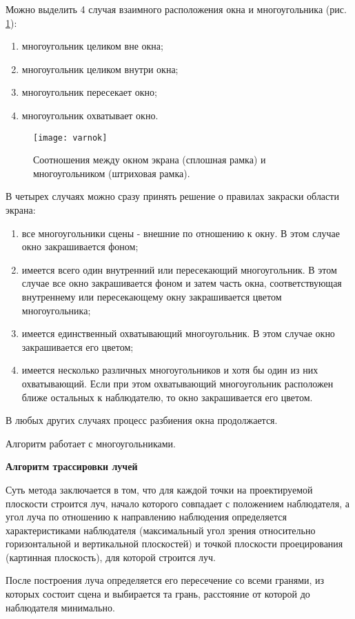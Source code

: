 Можно выделить 4 случая взаимного расположения окна и многоугольника (рис. \ref{img:varnok}):
\begin{enumerate}
	\item многоугольник целиком вне окна;
	\item многоугольник целиком внутри окна;
	\item многоугольник пересекает окно;
	\item многоугольник охватывает окно.
\end{enumerate}

\begin{figure}[H]
	\centering
	\texttt{[image: varnok]}
	\caption{Соотношения между окном экрана (сплошная рамка) и многоугольником (штриховая рамка). }
	\label{img:varnok}
\end{figure}

В четырех случаях можно сразу принять решение о правилах закраски области экрана:
\begin{enumerate}
	\item все многоугольники сцены - внешние по отношению к окну. В этом случае окно закрашивается фоном;
	\item имеется всего один внутренний или пересекающий многоугольник. В этом случае все окно закрашивается фоном и затем часть окна, соответствующая внутреннему или пересекающему окну закрашивается цветом многоугольника;
	\item имеется единственный охватывающий многоугольник. В этом случае окно закрашивается его цветом;
	\item имеется несколько различных многоугольников и хотя бы один из них охватывающий. Если при этом охватывающий многоугольник расположен ближе остальных к наблюдателю, то окно закрашивается его цветом.
\end{enumerate}
В любых других случаях процесс разбиения окна продолжается.

Алгоритм работает с многоугольниками. 

\textbf{Алгоритм трассировки лучей }

Суть метода заключается в том, что для каждой точки на проектируемой плоскости строится луч, начало которого совпадает с положением наблюдателя, а угол луча по отношению к направлению наблюдения определяется характеристиками наблюдателя (максимальный угол зрения относительно горизонтальной и вертикальной плоскостей) и точкой плоскости проецирования (картинная плоскость), для которой строится луч. 

После построения луча определяется его пересечение со всеми гранями, из которых состоит сцена и выбирается та грань, расстояние от которой до наблюдателя минимально.

